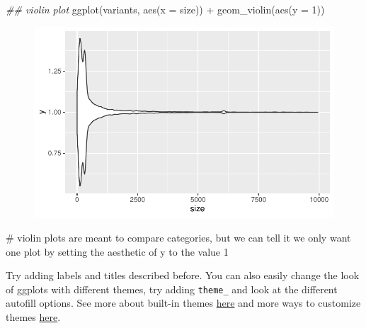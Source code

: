 \documentclass[
  letterpaper,
  DIV=11,
  numbers=noendperiod]{scrreprt}
\newenvironment{Shaded}{\begin{snugshade}}{\end{snugshade}}
\newcommand{\AttributeTok}[1]{\textcolor[rgb]{0.40,0.45,0.13}{#1}}
\newcommand{\CommentTok}[1]{\textcolor[rgb]{0.37,0.37,0.37}{#1}}
\newcommand{\DecValTok}[1]{\textcolor[rgb]{0.68,0.00,0.00}{#1}}
\newcommand{\DocumentationTok}[1]{\textcolor[rgb]{0.37,0.37,0.37}{\textit{#1}}}
\newcommand{\FunctionTok}[1]{\textcolor[rgb]{0.28,0.35,0.67}{#1}}
\newcommand{\NormalTok}[1]{\textcolor[rgb]{0.00,0.23,0.31}{#1}}
\newcommand{\SpecialCharTok}[1]{\textcolor[rgb]{0.37,0.37,0.37}{#1}}
\begin{document}
\begin{Shaded}
\begin{Highlighting}[]
\DocumentationTok{\#\# violin plot}
\FunctionTok{ggplot}\NormalTok{(variants, }\FunctionTok{aes}\NormalTok{(}\AttributeTok{x =}\NormalTok{ size)) }\SpecialCharTok{+}
  \FunctionTok{geom\_violin}\NormalTok{(}\FunctionTok{aes}\NormalTok{(}\AttributeTok{y =} \DecValTok{1}\NormalTok{)) }
\end{Highlighting}
\end{Shaded}

\begin{figure}[H]

{\centering \includegraphics{scripts/02_dataViz/class3_files/figure-pdf/unnamed-chunk-14-4.pdf}

}

\end{figure}

\begin{Shaded}
\begin{Highlighting}[]
\CommentTok{\# violin plots are meant to compare categories, but we can tell it we only want one plot by setting the aesthetic of \textasciigrave{}y\textasciigrave{} to the value 1}
\end{Highlighting}
\end{Shaded}

Try adding labels and titles described before. You can also easily
change the look of ggplots with different themes, try adding
\texttt{theme\_} and look at the different autofill options. See more
about built-in themes
\href{https://ggplot2.tidyverse.org/reference/ggtheme.html}{here} and
more ways to customize themes
\href{https://ggplot2.tidyverse.org/reference/ggtheme.html}{here}.
\end{document}
